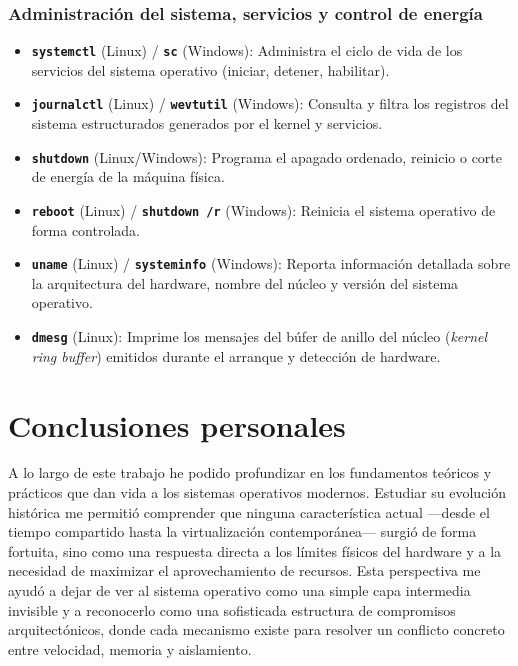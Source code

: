 \documentclass[12pt]{article}
\begin{document}
\subsubsection{Administración del sistema, servicios y control de energía}
\begin{itemize}[leftmargin=*, noitemsep, topsep=2pt]
    \item \textbf{\texttt{systemctl}} (Linux) / \textbf{\texttt{sc}} (Windows): Administra el ciclo de vida de los servicios del sistema operativo (iniciar, detener, habilitar).
    \item \textbf{\texttt{journalctl}} (Linux) / \textbf{\texttt{wevtutil}} (Windows): Consulta y filtra los registros del sistema estructurados generados por el kernel y servicios.
    \item \textbf{\texttt{shutdown}} (Linux/Windows): Programa el apagado ordenado, reinicio o corte de energía de la máquina física.
    \item \textbf{\texttt{reboot}} (Linux) / \textbf{\texttt{shutdown /r}} (Windows): Reinicia el sistema operativo de forma controlada.
    \item \textbf{\texttt{uname}} (Linux) / \textbf{\texttt{systeminfo}} (Windows): Reporta información detallada sobre la arquitectura del hardware, nombre del núcleo y versión del sistema operativo.
    \item \textbf{\texttt{dmesg}} (Linux): Imprime los mensajes del búfer de anillo del núcleo (\textit{kernel ring buffer}) emitidos durante el arranque y detección de hardware.
\end{itemize}

\section{Conclusiones personales}\label{sec:conclusionesPersonales}

A lo largo de este trabajo he podido profundizar en los fundamentos teóricos y prácticos que dan vida a los sistemas operativos modernos. Estudiar su evolución histórica me permitió comprender que ninguna característica actual —desde el tiempo compartido hasta la virtualización contemporánea— surgió de forma fortuita, sino como una respuesta directa a los límites físicos del hardware y a la necesidad de maximizar el aprovechamiento de recursos. Esta perspectiva me ayudó a dejar de ver al sistema operativo como una simple capa intermedia invisible y a reconocerlo como una sofisticada estructura de compromisos arquitectónicos, donde cada mecanismo existe para resolver un conflicto concreto entre velocidad, memoria y aislamiento.
\end{document}

